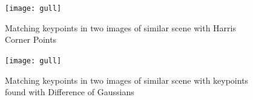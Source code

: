 \documentclass{article}
\begin{document}
\begin{figure}
\centering
\texttt{[image: gull]}
\caption{Matching keypoints in two images of similar scene with Harris Corner Points}
\label{fig:matching}
\end{figure}

\begin{figure}
\centering
\texttt{[image: gull]}
\caption{Matching keypoints in two images of similar scene with keypoints found with Difference of Gaussians}
\label{fig:matDoG}
\end{figure}

{}

\end{document}
